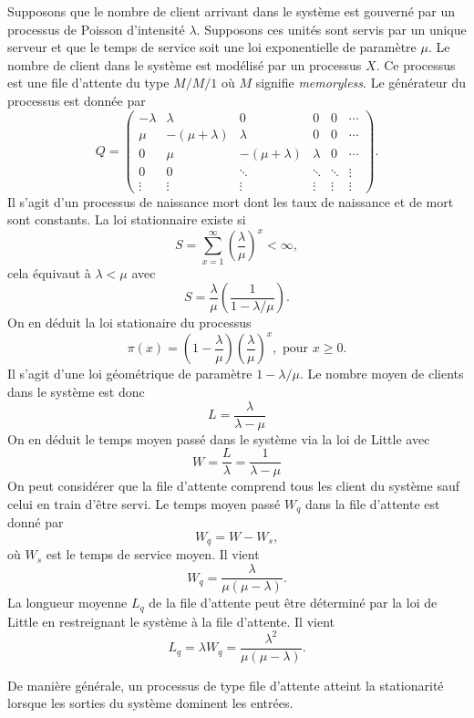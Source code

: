 \begin{ex}
Supposons que le nombre de client arrivant dans le système est gouverné par un processus de Poisson d'intensité $\lambda$. Supposons ces unités sont servis par un unique serveur et que le temps de service soit une loi exponentielle de paramètre $\mu$. Le nombre de client dans le système est modélisé par un processus $X$. Ce processus est une file d'attente du type $M/M/1$ où $M$ signifie \textit{memoryless}. Le générateur du processus est donnée par 
$$
Q=\left(
\begin{array}{ccccccc}
-\lambda&\lambda&0&0&0&\cdots \\
\mu&-(\mu +\lambda)&\lambda&0&0&\cdots \\
0&\mu&-(\mu +\lambda)&\lambda&0&\cdots \\
0&0&\ddots&\ddots&\ddots &\vdots \\
\vdots&\vdots&\vdots&\vdots&\vdots&\vdots
\end{array}
\right).
$$
Il s'agit d'un processus de naissance mort dont les taux de naissance et de mort sont constants. La loi stationnaire existe si 
$$
S = \sum_{x = 1}^\infty\left(\frac{\lambda}{\mu}\right)^x <\infty,
$$
cela équivaut à $\lambda <\mu$ avec 
$$
S = \frac{\lambda}{\mu}\left(\frac{1}{1-\lambda / \mu}\right).
$$
On en déduit la loi stationaire du processus 
$$
\pi(x) = \left(1-\frac{\lambda}{\mu}\right)\left(\frac \lambda\mu\right)^x,\text{ pour }x\geq 0.
$$
Il s'agit d'une loi géométrique de paramètre $1-\lambda / \mu$. Le nombre moyen de clients dans le système est donc 
$$
L = \frac{\lambda}{\lambda - \mu}
$$
On en déduit le temps moyen passé dans le système via la loi de Little avec 
$$
W = \frac{L}{\lambda} = \frac{1}{\lambda - \mu}
$$
On peut considérer que la file d'attente comprend tous les client du système sauf celui en train d'être servi. Le temps moyen passé $W_q$ dans la file d'attente est donné par
$$
W_q = W - W_s, 
$$
où $W_s$ est le temps de service moyen. Il vient 
$$
W_q= \frac{\lambda}{\mu(\mu - \lambda)}.
$$
La longueur moyenne $L_q$ de la file d'attente peut être déterminé par la loi de Little en restreignant le système à la file d'attente. Il vient 
$$
L_q = \lambda W_q = \frac{\lambda^2}{\mu(\mu - \lambda)}.
$$


\end{ex}
De manière générale, un processus de type file d'attente atteint la stationarité lorsque les sorties du système dominent les entrées.
